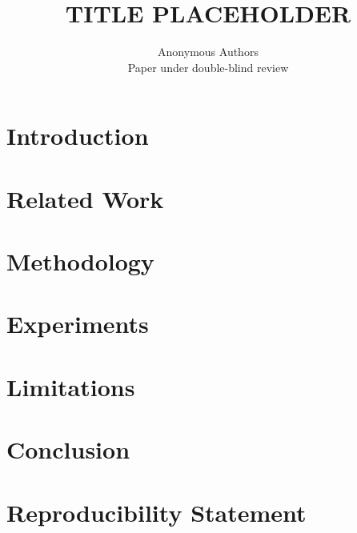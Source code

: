 \documentclass[10pt]{article}
\title{TITLE PLACEHOLDER}
\author{Anonymous Authors\\
Paper under double-blind review}
\begin{document}
\maketitle

\begin{abstract}
\end{abstract}

\section{Introduction}
\label{sec:intro}

\section{Related Work}
\label{sec:related_work}

\section{Methodology}
\label{sec:method}

\section{Experiments}
\label{sec:experiments}

\section{Limitations}
\label{sec:limitations}

\section{Conclusion}
\label{sec:conclusion}

\section*{Reproducibility Statement}




\clearpage
\appendix
\end{document}
